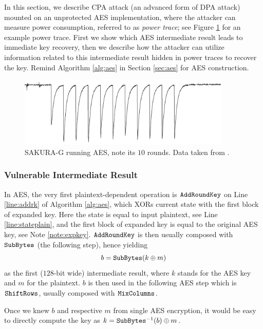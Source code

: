 In this section, we describe CPA attack (an advanced form of DPA attack) mounted on an unprotected AES implementation, where the attacker can measure power consumption, referred to as {\em power trace}; see Figure \ref{fig:powertrace} for an example power trace. First we show which AES intermediate result leads to immediate key recovery, then we describe how the attacker can utilize information related to this intermediate result hidden in power traces to recover the key. Remind Algorithm \ref{alg:aes} in Section \ref{sec:aes} for AES construction.

\begin{figure}[h]
\begin{center}
	\includegraphics[width=0.9\textwidth]{./figures/power_trace/power_trace.png}
	\caption{SAKURA-G running AES, note its $10$ rounds. Data taken from \cite{exampletraces}.}
	\label{fig:powertrace}
\end{center}
\end{figure}

\subsubsection{Vulnerable Intermediate Result}
	
	In AES, the very first plaintext-dependent operation is $\texttt{AddRoundKey}$ on Line \ref{line:addrk} of Algorithm \ref{alg:aes}, which XORs current state with the first block of expanded key. Here the state is equal to input plaintext, see Line \ref{line:stateplain}, and the first block of expanded key is equal to the original AES key, see Note \ref{note:expkey}. $\texttt{AddRoundKey}$ is then usually composed with $\texttt{SubBytes}$ (the following step), hence yielding
	\begin{equation}
	\label{eq:byprod}
		b = \texttt{SubBytes}(k\oplus m)
	\end{equation}
	as the first ($128$-bit wide) intermediate result, where $k$ stands for the AES key and $m$ for the plaintext. $b$ is then used in the following AES step which is $\texttt{ShiftRows}$, usually composed with $\texttt{MixColumns}$.
		
	Once we knew $b$ and respective $m$ from single AES encryption, it would be easy to directly compute the key as $k = {\texttt{SubBytes}}^{-1}(b)\oplus m$.

